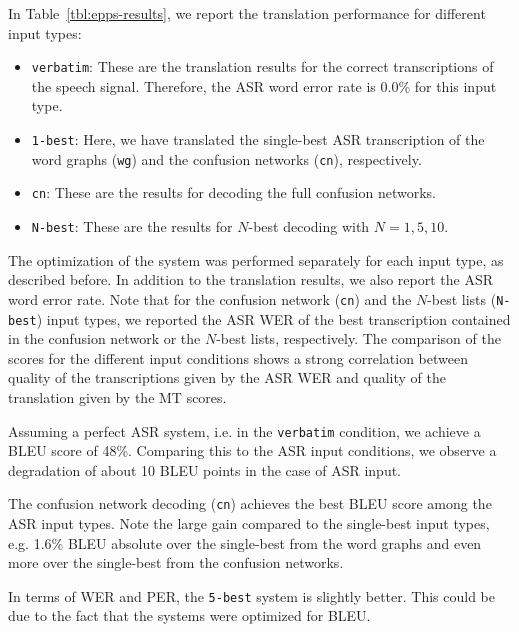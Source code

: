 \documentclass[10pt]{report}
\theoremstyle{plain}
\begin{document}
{In Table~\ref{tbl:epps-results}, we report the translation performance for different input types:
\begin{itemize}
\item {\tt verbatim}: These are the translation results for the correct transcriptions of the speech signal. Therefore, the ASR word error rate is 0.0\% for this input type.
\item {\tt 1-best}: Here, we have translated the single-best ASR transcription of the word graphs ({\tt wg}) and the confusion networks ({\tt cn}), respectively.
\item {\tt cn}: These are the results for decoding the full confusion networks.
\item {\tt N-best}: These are the results for $N$-best decoding with $N=1,5,10$.
\end{itemize}
The optimization of the system was performed separately for each input type, as described before.
In addition to the translation results, we also report the ASR word error rate.
Note that for the confusion network ({\tt cn}) and the $N$-best lists ({\tt N-best}) input types,  we reported the ASR WER of the best transcription contained in the confusion network or the $N$-best lists, respectively.
The comparison of the scores for the different input conditions %
shows a strong correlation between quality of the transcriptions given by the ASR WER and quality of the translation given by the MT scores.

Assuming a perfect ASR system, i.e. in the {\tt verbatim} condition, we achieve a BLEU score of 48\%.
Comparing this to the ASR input conditions, we observe a degradation of about 10 BLEU points in the case of ASR input.

The confusion network decoding ({\tt cn}) achieves the best BLEU score among the ASR input types. %
Note the large gain compared to the single-best input types, e.g. 1.6\% BLEU absolute over the single-best from the word graphs and even more over the single-best from the confusion networks.

In terms of WER and PER, the {\tt 5-best} system is slightly better.
This could be due to the fact that the systems were optimized for BLEU.

}
\end{document}
